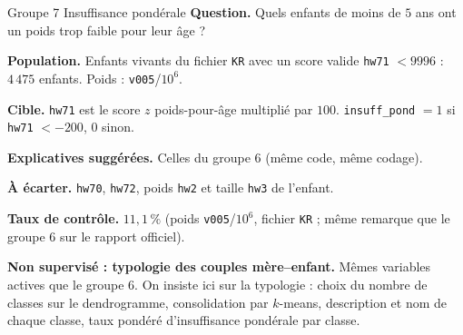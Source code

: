 \documentclass[11pt]{article}
\begin{document}
\begin{fiche}{Groupe 7 \textendash{} Insuffisance pondérale}
\textbf{Question.} Quels enfants de moins de $5$ ans ont un poids trop faible pour leur âge ?

\textbf{Population.} Enfants vivants du fichier \texttt{KR} avec un score valide \texttt{hw71} $<9996$ : $4\,475$ enfants. Poids : \texttt{v005}/$10^6$.

\textbf{Cible.} \texttt{hw71} est le score $z$ poids-pour-âge multiplié par $100$. \texttt{insuff\_pond} $=1$ si \texttt{hw71} $<-200$, $0$ sinon.

\textbf{Explicatives suggérées.} Celles du groupe 6 (même code, même codage).

\textbf{À écarter.} \texttt{hw70}, \texttt{hw72}, poids \texttt{hw2} et taille \texttt{hw3} de l'enfant.

\textbf{Taux de contrôle.} $11{,}1\,\%$ (poids \texttt{v005}/$10^6$, fichier \texttt{KR} ; même remarque que le groupe 6 sur le rapport officiel).

\textbf{Non supervisé : typologie des couples mère--enfant.} Mêmes variables actives que le groupe 6. On insiste ici sur la typologie : choix du nombre de classes sur le dendrogramme, consolidation par $k$-means, description et nom de chaque classe, taux pondéré d'insuffisance pondérale par classe.
\end{fiche}

\end{document}
